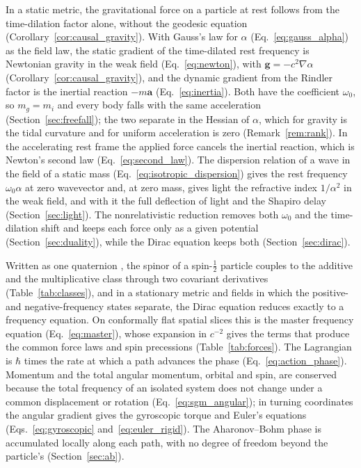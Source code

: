 \documentclass[aps,prd,onecolumn,tightenlines,nofootinbib,notitlepage,11pt,floatfix]{revtex4-2}
\theoremstyle{indentedtheorem}
\begin{document}
In a static metric, the gravitational force on a particle at rest follows from the time-dilation factor alone, without the geodesic equation (Corollary~\ref{cor:causal_gravity}). With Gauss's law for $\alpha$ (Eq.~\eqref{eq:gauss_alpha}) as the field law, the static gradient of the time-dilated rest frequency is Newtonian gravity in the weak field (Eq.~\eqref{eq:newton}), with $\mathbf{g}=-c^2\nabla\alpha$ (Corollary~\ref{cor:causal_gravity}), and the dynamic gradient from the Rindler factor is the inertial reaction $-m\mathbf{a}$ (Eq.~\eqref{eq:inertia}). Both have the coefficient $\omega_0$, so $m_g=m_i$ and every body falls with the same acceleration (Section~\ref{sec:freefall}); the two separate in the Hessian of $\alpha$, which for gravity is the tidal curvature and for uniform acceleration is zero (Remark~\ref{rem:rank}). In the accelerating rest frame the applied force cancels the inertial reaction, which is Newton's second law (Eq.~\eqref{eq:second_law}). The dispersion relation of a wave in the field of a static mass (Eq.~\eqref{eq:isotropic_dispersion}) gives the rest frequency $\omega_0\alpha$ at zero wavevector and, at zero mass, gives light the refractive index $1/\alpha^2$ in the weak field, and with it the full deflection of light and the Shapiro delay (Section~\ref{sec:light}). The nonrelativistic reduction removes both $\omega_0$ and the time-dilation shift and keeps each force only as a given potential (Section~\ref{sec:duality}), while the Dirac equation keeps both (Section~\ref{sec:dirac}).

Written as one quaternion \citep{HutchisonWavefn2026}, the spinor of a spin-$\tfrac12$ particle couples to the additive and the multiplicative class through two covariant derivatives (Table~\ref{tab:classes}), and in a stationary metric and fields in which the positive- and negative-frequency states separate, the Dirac equation reduces exactly to a frequency equation. On conformally flat spatial slices this is the master frequency equation (Eq.~\eqref{eq:master}), whose expansion in $c^{-2}$ gives the terms that produce the common force laws and spin precessions (Table~\ref{tab:forces}). The Lagrangian is $\hbar$ times the rate at which a path advances the phase (Eq.~\eqref{eq:action_phase}). Momentum and the total angular momentum, orbital and spin, are conserved because the total frequency of an isolated system does not change under a common displacement or rotation (Eq.~\eqref{eq:sgm_angular}); in turning coordinates the angular gradient gives the gyroscopic torque and Euler's equations (Eqs.~\eqref{eq:gyroscopic} and~\eqref{eq:euler_rigid}). The Aharonov--Bohm phase is accumulated locally along each path, with no degree of freedom beyond the particle's (Section~\ref{sec:ab}).
\end{document}
